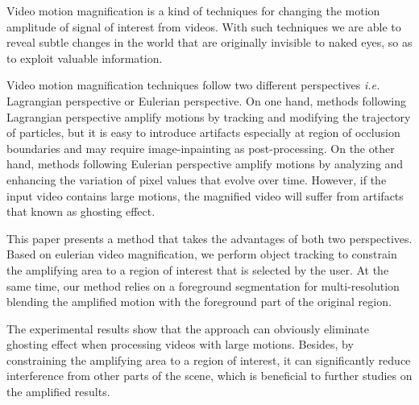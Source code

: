 \begin{eabstract}
  Video motion magnification is a kind of techniques for changing the motion
  amplitude of signal of interest from videos. With such techniques we are able
  to reveal subtle changes in the world that are originally invisible to naked
  eyes, so as to exploit valuable information.

  Video motion magnification techniques follow two different perspectives
  \textsl{i.e.} Lagrangian perspective or Eulerian perspective. On one hand,
  methods following Lagrangian perspective amplify motions by tracking and
  modifying the trajectory of particles, but it is easy to introduce artifacts
  especially at region of occlusion boundaries and may require image-inpainting
  as post-processing. On the other hand, methods following Eulerian perspective
  amplify motions by analyzing and enhancing the variation of pixel values that
  evolve over time. However, if the input video contains large motions, the
  magnified video will suffer from artifacts that known as ghosting effect.

  This paper presents a method that takes the advantages of both two
  perspectives. Based on eulerian video magnification, we perform object
  tracking to constrain the amplifying area to a region of interest that is
  selected by the user. At the same time, our method relies on a foreground
  segmentation for multi-resolution blending the amplified motion with the
  foreground part of the original region.

  The experimental results show that the
  approach can obviously eliminate ghosting effect when processing videos with
  large motions. Besides, by constraining the amplifying area to a region of
  interest, it can significantly reduce interference from other parts of the
  scene, which is beneficial to further studies on the amplified results.
\end{eabstract}
